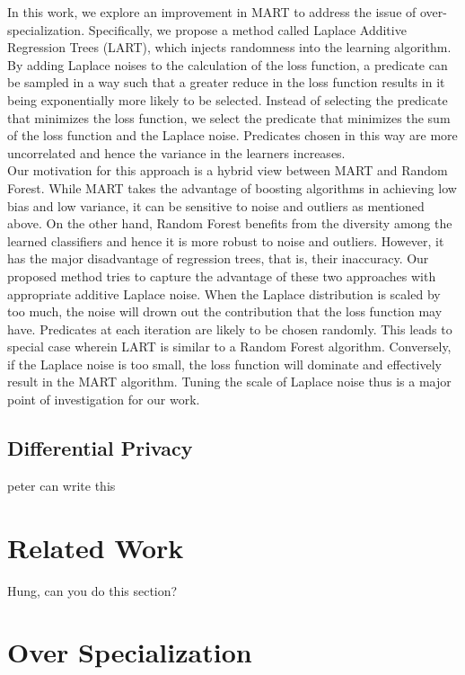 \documentclass{article} %
\begin{document}
In this work, we explore an improvement in MART to address the issue of over-specialization. Specifically, we propose a method called Laplace Additive Regression Trees (LART), which injects randomness into the learning algorithm.
By adding Laplace noises to the calculation of the loss function, a predicate can be sampled in a way such that a greater reduce in the loss function results in it being exponentially more likely to be selected. Instead of selecting the predicate that minimizes the loss function, we select the predicate that minimizes the sum of the loss function and the Laplace noise. Predicates chosen in this way are more uncorrelated and hence the variance in the learners increases.\\

Our motivation for this approach is a hybrid view between MART and Random Forest. While MART takes the advantage of boosting algorithms in achieving low bias and low variance, it can be sensitive to noise and outliers as mentioned above. On the other hand, Random Forest benefits from the diversity among the learned classifiers and hence it is more robust to noise and outliers. However, it has the major disadvantage of regression trees, that is, their inaccuracy. Our proposed method tries to capture the advantage of these two approaches with appropriate additive Laplace noise. When the Laplace distribution is scaled by too much, the noise will drown out the contribution that the loss function may have. Predicates at each iteration are likely to be chosen randomly. This leads to special case wherein LART is similar to a Random Forest algorithm. Conversely, if the Laplace noise is too small, the loss function will dominate and effectively result in the MART algorithm. Tuning the scale of Laplace noise thus is a major point of investigation for our work.



\subsection{Differential Privacy }

peter can write this

\section{Related Work}

Hung, can you do this section?

\section{Over Specialization}
\end{document}
